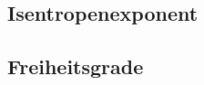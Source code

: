 \documentclass{article}
\begin{document}
    \subsection{Isentropenexponent}
        

    \subsection{Freiheitsgrade}

        
\end{document}
